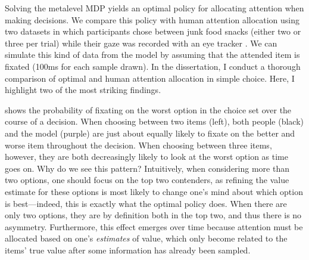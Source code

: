 \documentclass[dsingle]{memo}
\begin{document}
Solving the metalevel MDP yields an optimal policy for allocating attention when making decisions. We compare this policy with human attention allocation using two datasets in which participants chose between junk food snacks (either two or three per trial) while their gaze was recorded with an eye tracker \citep{krajbich2010visual,krajbich2011multialternative}. We can simulate this kind of data from the model by assuming that the attended item is fixated (100ms for each sample drawn). In the dissertation, I conduct a thorough comparison of optimal and human attention allocation in simple choice. Here, I highlight two of the most striking findings.



 shows the probability of fixating on the worst option in the choice set over the course of a decision. When choosing between two items (left), both people (black) and the model (purple) are just about equally likely to fixate on the better and worse item throughout the decision. When choosing between three items, however, they are both decreasingly likely to look at the worst option as time goes on. Why do we see this pattern? Intuitively, when considering more than two options, one should focus on the top two contenders, as refining the value estimate for these options is most likely to change one's mind about which option is best---indeed, this is exactly what the optimal policy does. When there are only two options, they are by definition both in the top two, and thus there is no asymmetry. Furthermore, this effect emerges over time because attention must be allocated based on one's \emph{estimates} of value, which only become related to the items' true value after some information has already been sampled. 
\end{document}
